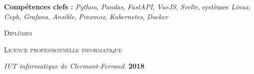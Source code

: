 \documentclass[10pt, a4paper]{article}
\newcommand{\dates}[1]{\hfill\mbox{\textbf{#1}}}
\newcommand{\headright}[1]{\vspace*{2.5ex}\textsc{\Large\color{accent}#1}\par%
     \vspace*{-2ex}{\color{accent}\hrulefill}\par}
\begin{document}
\begin{minipage}[t]{0.56\textwidth}
{\textbf{Compétences clefs :} \emph{Python}, \emph{Pandas}, \emph{FastAPI}, \emph{VueJS}, \emph{Svelte}, systèmes \emph{Linux}, \emph{Ceph}, \emph{Grafana}, \emph{Ansible}, \emph{Proxmox}, \emph{Kubernetes}, \emph{Docker}
}

\headright{Diplômes}

\textsc{Licence professionnelle informatique}

\textit{IUT informatique de Clermont-Ferrand}. \dates{2018}

\end{minipage}
\end{document}

